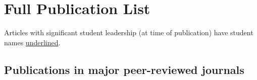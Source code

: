 \documentclass[11pt,letterpaper,sans]{moderncv}
\begin{document}

\section{Full Publication List} %

Articles with significant student leadership (at time of publication) have student names \underline{underlined}.

%
%

\subsection{Publications in major peer-reviewed journals} \vspace{-0.3cm}
\end{document}
